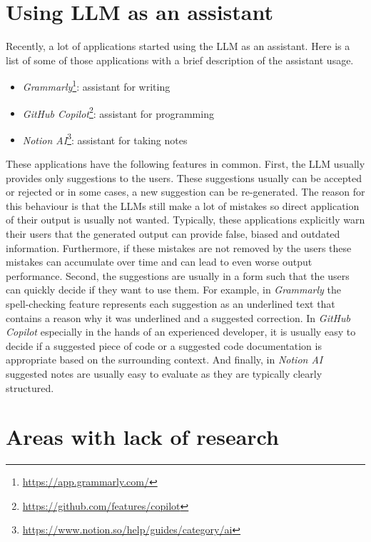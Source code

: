 \section*{Using LLM as an assistant}
\label{section:llm_as_an_assistant}

Recently, a lot of applications started using the LLM as an assistant. Here is a list of some of those applications with a brief description of the assistant usage.

\begin{itemize}
\item \textit{Grammarly}\footnote{\url{https://app.grammarly.com/}}: assistant for writing
\item \textit{GitHub Copilot}\footnote{\url{https://github.com/features/copilot}}: assistant for programming
\item \textit{Notion AI}\footnote{\url{https://www.notion.so/help/guides/category/ai}}: assistant for taking notes
\end{itemize}

These applications have the following features in common. First, the LLM usually provides only suggestions to the users. These suggestions usually can be accepted or rejected or in some cases, a new suggestion can be re-generated. The reason for this behaviour is that the LLMs still make a lot of mistakes so direct application of their output is usually not wanted. Typically, these applications explicitly warn their users that the generated output can provide false, biased and outdated information. Furthermore, if these mistakes are not removed by the users these mistakes can accumulate over time and can lead to even worse output performance. Second, the suggestions are usually in a form such that the users can quickly decide if they want to use them. For example, in \textit{Grammarly} the spell-checking feature represents each suggestion as an underlined text that contains a reason why it was underlined and a suggested correction. In \textit{GitHub Copilot} especially in the hands of an experienced developer, it is usually easy to decide if a suggested piece of code or a suggested code documentation is appropriate based on the surrounding context. And finally, in \textit{Notion AI} suggested notes are usually easy to evaluate as they are typically clearly structured.


\section*{Areas with lack of research}

